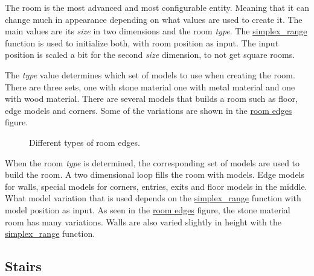 \documentclass[a4paper]{article}
\begin{document}
The room is the most advanced and most configurable entity. Meaning that it can change much in appearance depending on what values are used to create it. The main values are its \emph{size} in two dimensions and the room \emph{type}. The \hyperref[simplex-range]{simplex\_range} function is used to initialize both, with room position as input. The input position is scaled a bit for the second \emph{size} dimension, to not get square rooms.

The \emph{type} value determines which set of models to use when creating the room. There are three sets, one with stone material one with metal material and one with wood material. There are several models that builds a room such as floor, edge models and corners. Some of the variations are shown in the \hyperref[room-edges]{room edges} figure.

\begin{figure}
\noindent{}\label{room-edges}

\caption{Different types of room edges.}
\end{figure}

When the room \emph{type} is determined, the corresponding set of models are used to build the room. A two dimensional loop fills the room with models. Edge models for walls, special models for corners, entries, exits and floor models in the middle. What model variation that is used depends on the \hyperref[simplex-range]{simplex\_range} function with model position as input. As seen in the \hyperref[room-edges]{room edges} figure, the stone material room has many variations. Walls are also varied slightly in height with the \hyperref[simplex-range]{simplex\_range} function.


\subsection{Stairs%
  \label{stairs}%
}
\end{document}
